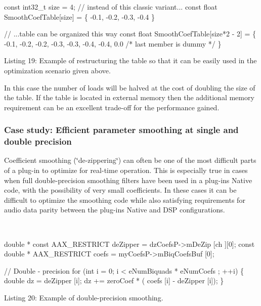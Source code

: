 \begin{DoxyCode}
\textcolor{keyword}{const} int32\_t size = 4;
\textcolor{comment}{// instead of this classic variant...}
\textcolor{keyword}{const} \textcolor{keywordtype}{float} SmoothCoefTable[size] = \{
    -0.1, -0.2, -0.3, -0.4
\}

\textcolor{comment}{// ...table can be organized this way}
\textcolor{keyword}{const} \textcolor{keywordtype}{float} SmoothCoefTable[size*2 - 2] = \{
    -0.1, -0.2, 
    -0.2, -0.3,
    -0.3, -0.4,
    -0.4,  0.0 \textcolor{comment}{/* last member is dummy */}
\}
\end{DoxyCode}
  Listing 19\+: Example of restructuring the table so that it can be easily used in the optimization scenario given above.

In this case the number of loads will be halved at the cost of doubling the size of the table. If the table is located in external memory then the additional memory requirement can be an excellent trade-\/off for the performance gained.

\hypertarget{a00362_subsection__case_study_efficient_parameter_smoothing_at_single_and_double_precision}{}\subsubsection{Case study\+: Efficient parameter smoothing at single and double precision}\label{a00362_subsection__case_study_efficient_parameter_smoothing_at_single_and_double_precision}
 Coefficient smoothing (\char`\"{}de-\/zippering\char`\"{}) can often be one of the most difficult parts of a plug-\/in to optimize for real-\/time operation. This is especially true in cases when full double-\/precision smoothing filters have been used in a plug-\/in\textquotesingle{}s Native code, with the possibility of very small coefficients. In these cases it can be difficult to optimize the smoothing code while also satisfying requirements for audio data parity between the plug-\/in\textquotesingle{}s Native and D\+S\+P configurations.

~


\begin{DoxyCode}
\textcolor{keywordtype}{double} * \textcolor{keyword}{const} AAX\_RESTRICT deZipper = dzCoefsP->mDeZip [ch ][0];
\textcolor{keyword}{const} \textcolor{keywordtype}{double} * AAX\_RESTRICT coefs = myCoefsP->mBiqCoefsBuf [0];

\textcolor{comment}{// Double - precision}
\textcolor{keywordflow}{for} (\textcolor{keywordtype}{int} i = 0; i < eNumBiquads * eNumCoefs ; ++i)
\{
    \textcolor{keywordtype}{double} dz = deZipper [i];
    dz += zeroCoef * ( coefs [i] - deZipper [i]);
\} 
\end{DoxyCode}
  Listing 20\+: Example of double-\/precision smoothing.

